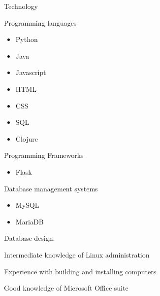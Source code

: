 


\begin{cventriesskill}


\cventryskill
{Technology} %
{ %
\begin{cvitems}
\item {Programming languages}
\begin{itemize}
	\item Python
	\item Java
	\item Javascript
	\item HTML
	\item CSS
	\item SQL
	\item Clojure
\end{itemize}
\item {Programming Frameworks}
\begin{itemize}
	\item Flask
\end{itemize}
\item {Database management systems}
\begin{itemize}
	\item MySQL
	\item MariaDB
\end{itemize}
\item {Database design.}
\item {Intermediate knowledge of Linux administration}
\item {Experience with building and installing computers}
\item {Good knowledge of Microsoft Office suite}
\end{cvitems}
}


\end{cventriesskill}